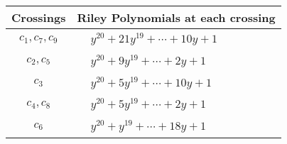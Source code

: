 \documentclass[1p]{elsarticle_modified}
\theoremstyle{definition}
\begin{document}
\begin{tabular}{m{50pt}|m{274pt}}
Crossings & \hspace{64pt}Riley Polynomials at each crossing \\
\hline $$\begin{aligned}c_{1},c_{7},c_{9}\end{aligned}$$&$\begin{aligned}
&y^{20}+21 y^{19}+\cdots+10 y+1
\end{aligned}$\\
\hline $$\begin{aligned}c_{2},c_{5}\end{aligned}$$&$\begin{aligned}
&y^{20}+9 y^{19}+\cdots+2 y+1
\end{aligned}$\\
\hline $$\begin{aligned}c_{3}\end{aligned}$$&$\begin{aligned}
&y^{20}+5 y^{19}+\cdots+10 y+1
\end{aligned}$\\
\hline $$\begin{aligned}c_{4},c_{8}\end{aligned}$$&$\begin{aligned}
&y^{20}+5 y^{19}+\cdots+2 y+1
\end{aligned}$\\
\hline $$\begin{aligned}c_{6}\end{aligned}$$&$\begin{aligned}
&y^{20}+y^{19}+\cdots+18 y+1
\end{aligned}$\\
\hline
\end{tabular}
\vskip 2pc
\end{document}
